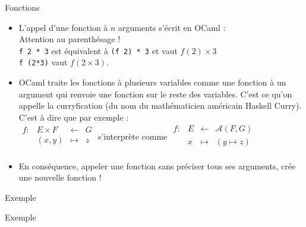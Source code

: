 \documentclass[10pt]{beamer}
\begin{document}
\begin{frame}{\Ctitle}{\stitle}
	\begin{block}{Fonctions}
		\begin{itemize}
			\item <1-> L'appel d'une fonction  à $n$ arguments s'écrit en OCaml :   \\
			      \textcolor{BrickRed}{\danger \;} Attention au parenthésage ! \\
			      {\tt f 2 * 3} est équivalent à {\tt (f 2) * 3} et vaut $f(2) \times 3$ \\
			      {\tt f (2*3)} vaut $f(2\times3)$.
			\item<2-> OCaml traite les fonctions à plusieurs variables comme une fonction à un argument qui renvoie une fonction sur le reste des variables. C'est ce qu'on appelle la \textcolor{BrickRed}{curryfication} (du nom du mathématicien américain Haskell Curry). C'est à dire que par exemple : \\
				$\begin{array}{llll}
						f : & E \times F & \leftarrow & G \\
						    & (x,y)      & \mapsto    & z \\
					\end{array}$ s'interprète comme
				$\begin{array}{llll}
						f : & E & \leftarrow & \mathcal{A}{(F,G)} \\
						    & x & \mapsto    & (y \mapsto z)      \\
					\end{array}$
			\item<3-> En conséquence, appeler une fonction sans préciser tous ses arguments, crée une nouvelle fonction !
		\end{itemize}
	\end{block}
\end{frame}

\begin{frame}{\Ctitle}{\stitle}
	\begin{exampleblock}{Exemple}
	\end{exampleblock}
\end{frame}

\begin{frame}{\Ctitle}{\stitle}
	\begin{exampleblock}{Exemple}
	\end{exampleblock}
\end{frame}
\end{document}
